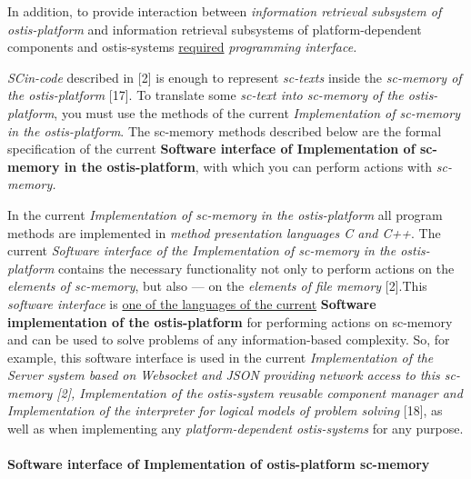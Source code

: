 \documentclass[10pt, twocolumn, a4paper]{article}
\begin{document}
In addition, to provide interaction between \textit {information 
retrieval subsystem of ostis-platform} and information
retrieval subsystems of platform-dependent components
and ostis-systems \underline{required} \textit {programming interface.}
\par \textit {SCin-code} described in [2] is enough to represent \textit {sc-texts} inside the \textit {sc-memory of the ostis-platform} [17]. To
translate some \textit {sc-text into sc-memory of the ostis-platform},
you must use the methods of the current \textit {Implementation of
sc-memory in the ostis-platform}. The sc-memory methods
described below are the formal specification of the current
\textbf{Software interface of Implementation of sc-memory in
the ostis-platform}, with which you can perform actions
\qquad with \textit{sc-memory.}
\par In the current \textit{Implementation of sc-memory in the
ostis-platform} all program methods are implemented in
\textit{method presentation languages C and C++}. The current
\textit{Software interface of the Implementation of sc-memory in
the ostis-platform} contains the necessary functionality not
only to perform actions on the\textit{ elements of sc-memory}, but
also — on the \textit{elements of file memory} [2].This \textit{software interface} is \underline{one of the languages of the current} \textbf{Software}
 \textbf{implementation of the ostis-platform} for performing
actions on sc-memory and can be used to solve problems
of any information-based complexity. So, for example, this
software interface is used in the current \textit{Implementation of
the Server system based on Websocket and JSON providing network access to this sc-memory \emph{[2]}, Implementation
of the ostis-system reusable component manager \emph{and}
Implementation of the interpreter for logical models of
problem solving} [18], as well as when implementing any
\textit{platform-dependent ostis-systems} for any purpose.
\\ \\
\textbf{Software interface of Implementation of ostis-platform
sc-memory}
\end{document}
